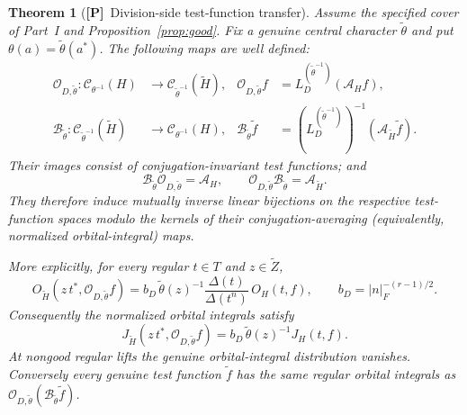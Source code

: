 \documentclass[11pt]{article}
\newcommand{\tH}{\widetilde H}
\newcommand{\tZ}{\widetilde Z}
\newcommand{\Ptag}{\textnormal{\textbf{[P]}}}
\theoremstyle{plain}
\newtheorem{theorem}{Theorem}[section]
\theoremstyle{definition}
\begin{document}
\begin{theorem}[\Ptag\ Division-side test-function transfer]\label{thm:test-transfer}
Assume the specified cover of Part~I and Proposition~\ref{prop:good}.
Fix a genuine central character $\widetilde\theta$ and put
$\theta(a)=\widetilde\theta(a^*)$. The following maps are well defined:
\begin{align}
\mathcal O_{D,\widetilde\theta}:\mathcal C_{\theta^{-1}}(H)
&\longrightarrow\mathcal C_{\widetilde\theta^{-1}}(\tH),
& \mathcal O_{D,\widetilde\theta}f
&=L_D^{(\widetilde\theta^{-1})}(\mathcal A_Hf),
\label{eq:test-transfer-definition}\\
\mathcal B_{\widetilde\theta}:\mathcal C_{\widetilde\theta^{-1}}(\tH)
&\longrightarrow\mathcal C_{\theta^{-1}}(H),
& \mathcal B_{\widetilde\theta}\widetilde f
&=(L_D^{(\widetilde\theta^{-1})})^{-1}
  (\mathcal A_{\tH}\widetilde f).
\label{eq:back-transfer-definition}
\end{align}
Their images consist of conjugation-invariant test functions; and
\[
\mathcal B_{\widetilde\theta}\mathcal O_{D,\widetilde\theta}
=\mathcal A_H,\qquad
\mathcal O_{D,\widetilde\theta}\mathcal B_{\widetilde\theta}
=\mathcal A_{\tH}.
\]
They therefore induce mutually inverse linear bijections on the
respective test-function spaces modulo the kernels of their
conjugation-averaging (equivalently, normalized orbital-integral) maps.

More explicitly, for every regular $t\in T$ and $z\in\tZ$,
\begin{equation}\label{eq:OI-transfer}
\boxed{\quad
O_{\tH}(z\,t^*,\mathcal O_{D,\widetilde\theta}f)
=b_D\,\widetilde\theta(z)^{-1}
\frac{\Delta(t)}{\Delta(t^n)}\,O_H(t,f),
\qquad b_D=|n|_F^{-(r-1)/2}.
\quad}
\end{equation}
Consequently the normalized orbital integrals satisfy
\begin{equation}\label{eq:JO-transfer}
\boxed{\quad
J_{\tH}(z\,t^*,\mathcal O_{D,\widetilde\theta}f)
=b_D\,\widetilde\theta(z)^{-1}J_H(t,f).
\quad}
\end{equation}
At nongood regular lifts the genuine orbital-integral distribution
vanishes. Conversely every genuine test function $\widetilde f$ has the
same regular orbital integrals as
$\mathcal O_{D,\widetilde\theta}(\mathcal B_{\widetilde\theta}\widetilde f)$.
\end{theorem}
\end{document}
